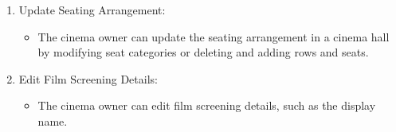 \begin{enumerate}
    \item Update Seating Arrangement:
    \begin{itemize}
        \item The cinema owner can update the seating arrangement in a cinema hall by modifying seat categories or deleting and adding rows and seats.
    \end{itemize}
    
    \item Edit Film Screening Details:
    \begin{itemize}
        \item The cinema owner can edit film screening details, such as the display name.
    \end{itemize}

\end{enumerate}

\label{apx:sec:model-requirements}

